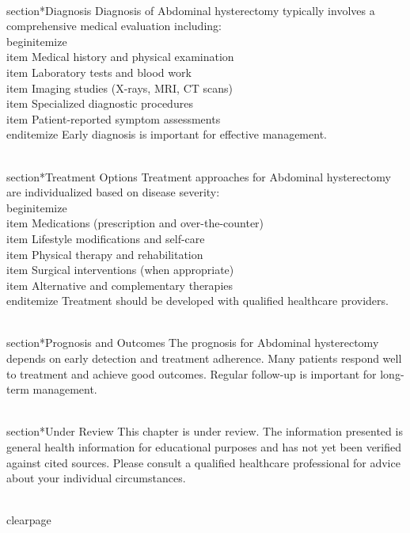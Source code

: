 \\section*{Diagnosis}
Diagnosis of Abdominal hysterectomy typically involves a comprehensive medical evaluation including:
\\begin{itemize}
  \\item Medical history and physical examination
  \\item Laboratory tests and blood work
  \\item Imaging studies (X-rays, MRI, CT scans)
  \\item Specialized diagnostic procedures
  \\item Patient-reported symptom assessments
\\end{itemize}
Early diagnosis is important for effective management.

\\section*{Treatment Options}
Treatment approaches for Abdominal hysterectomy are individualized based on disease severity:
\\begin{itemize}
  \\item Medications (prescription and over-the-counter)
  \\item Lifestyle modifications and self-care
  \\item Physical therapy and rehabilitation
  \\item Surgical interventions (when appropriate)
  \\item Alternative and complementary therapies
\\end{itemize}
Treatment should be developed with qualified healthcare providers.

\\section*{Prognosis and Outcomes}
The prognosis for Abdominal hysterectomy depends on early detection and treatment adherence. Many patients respond well to treatment and achieve good outcomes. Regular follow-up is important for long-term management.

\\section*{Under Review}
This chapter is under review. The information presented is general health information for educational purposes and has not yet been verified against cited sources. Please consult a qualified healthcare professional for advice about your individual circumstances.

\\clearpage
